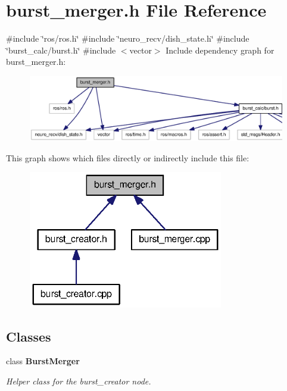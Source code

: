 \section{burst\-\_\-merger.\-h \-File \-Reference}
\label{burst__merger_8h}
{\ttfamily \#include \char`\"{}ros/ros.\-h\char`\"{}}\*
{\ttfamily \#include \char`\"{}neuro\-\_\-recv/dish\-\_\-state.\-h\char`\"{}}\*
{\ttfamily \#include \char`\"{}burst\-\_\-calc/burst.\-h\char`\"{}}\*
{\ttfamily \#include $<$vector$>$}\*
\-Include dependency graph for burst\-\_\-merger.\-h\-:\nopagebreak
\begin{figure}[H]
\begin{center}
\leavevmode
\includegraphics[width=350pt]{burst__merger_8h__incl}
\end{center}
\end{figure}
\-This graph shows which files directly or indirectly include this file\-:\nopagebreak
\begin{figure}[H]
\begin{center}
\leavevmode
\includegraphics[width=241pt]{burst__merger_8h__dep__incl}
\end{center}
\end{figure}
\subsection*{\-Classes}
\begin{DoxyCompactItemize}
\item 
class {\bf \-Burst\-Merger}
\begin{DoxyCompactList}\small\item\em \-Helper class for the burst\-\_\-creator node. \end{DoxyCompactList}\end{DoxyCompactItemize}
